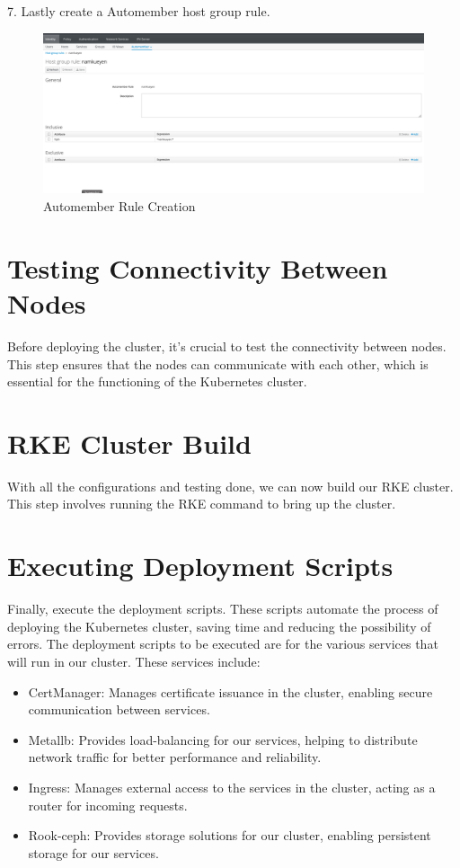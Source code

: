 7. Lastly create a Automember host group rule.

\begin{figure}
    \includegraphics[width=12cm]{Images/Image27.png}
    \centering
    \caption{Automember Rule Creation}
\end{figure}



\vfill\eject

\section{Testing Connectivity Between Nodes}
Before deploying the cluster, it's crucial to test the connectivity between nodes. This step ensures that the nodes can communicate with each other, which is essential for the functioning of the Kubernetes cluster.

\vfill\eject

\section{RKE Cluster Build}
With all the configurations and testing done, we can now build our RKE cluster. This step involves running the RKE command to bring up the cluster.

\vfill\eject

\section{Executing Deployment Scripts}
Finally, execute the deployment scripts. These scripts automate the process of deploying the Kubernetes cluster, saving time and reducing the possibility of errors. The deployment scripts to be executed are for the various services that will run in our cluster. These services include:

\begin{itemize}
    \item CertManager: Manages certificate issuance in the cluster, enabling secure communication between services.
    \item Metallb: Provides load-balancing for our services, helping to distribute network traffic for better performance and reliability.
    \item Ingress: Manages external access to the services in the cluster, acting as a router for incoming requests.
    \item Rook-ceph: Provides storage solutions for our cluster, enabling persistent storage for our services.
\end{itemize}